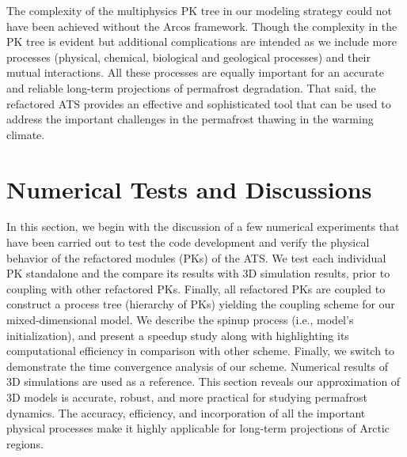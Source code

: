 \documentclass[review]{elsarticle}
\begin{document}
The complexity of the multiphysics PK tree in our modeling strategy could not have been achieved without the Arcos framework. Though the complexity in the PK tree is evident but additional complications are intended as we include more processes (physical, chemical, biological and geological processes) and their mutual interactions. All these processes are equally important for an accurate and reliable long-term projections of permafrost degradation. That said, the refactored ATS provides an effective and sophisticated tool that can be used to address the important challenges in the permafrost thawing in the warming climate.


\section{Numerical Tests and Discussions}

In this section, we begin with the discussion of a few numerical experiments that have been carried out to test the code development and verify the physical behavior of the refactored modules (PKs) of the ATS. We test each individual PK standalone and the compare its results with 3D simulation results, prior to coupling with other refactored PKs. Finally, all refactored PKs are coupled to construct a process tree (hierarchy of PKs) yielding the coupling scheme for our mixed-dimensional model.
We describe the spinup process (i.e., model's initialization), and present a speedup study along with highlighting its computational efficiency in comparison with other scheme. Finally, we switch to demonstrate the time convergence analysis of our scheme. Numerical results of 3D simulations are used as a reference. This section reveals our approximation of 3D models is accurate, robust, and more practical for studying permafrost dynamics. The accuracy, efficiency, and incorporation of all the important physical processes make it highly applicable for long-term projections of Arctic regions.
\end{document}
